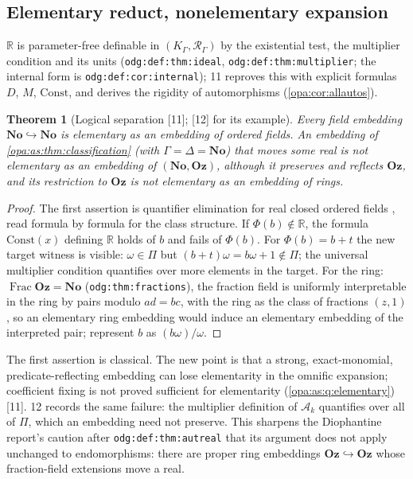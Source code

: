 \documentclass[11pt,oneside]{article}
\numberwithin{equation}{section}
\newtheorem{theorem}{Theorem}[section]
\theoremstyle{definition}
\theoremstyle{remark}
\newcommand{\No}{\mathbf{No}}
\newcommand{\Oz}{\mathbf{Oz}}
\newcommand{\R}{\mathbb R}
\newcommand{\Ak}{\mathcal A_k}
\newcommand{\Frac}{\operatorname{Frac}}
\newcommand{\src}[1]{\textup{\textsf{\small[#1]}}}
\newcommand{\lbl}[1]{\nolinkurl{#1}}
\begin{document}
\subsection{Elementary reduct, nonelementary expansion}

$\R$ is parameter-free definable in $(K_\Gamma,\mathcal R_\Gamma)$ by the existential test, the multiplier
condition and its units (\lbl{odg:def:thm:ideal}, \lbl{odg:def:thm:multiplier}; the internal form is
\lbl{odg:def:cor:internal}); 11 reproves this with explicit formulas $D$, $M$, $\mathrm{Const}$, and derives
the rigidity of automorphisms (\cref{opa:cor:allautos}).

\begin{theorem}[Logical separation \src{11}; \src{12} for its example]\label{opa:as:thm:elementary}
Every field embedding $\No\hookrightarrow\No$ is elementary as an embedding of ordered fields. An embedding
of \cref{opa:as:thm:classification} (with $\Gamma=\Delta=\No$) that moves some real is not elementary as an
embedding of $(\No,\Oz)$, although it preserves and reflects $\Oz$, and its restriction to $\Oz$ is not
elementary as an embedding of rings.
\end{theorem}
\begin{proof}
The first assertion is quantifier elimination for real closed ordered fields \cite{Marker}, read formula by
formula for the class structure. If $\Phi(b)\notin\R$, the formula $\mathrm{Const}(x)$ defining $\R$ holds of
$b$ and fails of $\Phi(b)$. For $\Phi(b)=b+t$ the new target witness is visible: $\omega\in\Pi$ but
$(b+t)\omega=b\omega+1\notin\Pi$; the universal multiplier condition quantifies over more elements in the
target. For the ring: $\Frac\Oz=\No$ (\lbl{odg:thm:fractions}), the fraction field is uniformly interpretable
in the ring by pairs modulo $ad=bc$, with the ring as the class of fractions $(z,1)$, so an elementary ring
embedding would induce an elementary embedding of the interpreted pair; represent $b$ as $(b\omega)/\omega$.
\end{proof}

The first assertion is classical. The new point is that a strong, exact-monomial, predicate-reflecting
embedding can lose elementarity in the omnific expansion; coefficient fixing is not proved sufficient for
elementarity (\cref{opa:as:q:elementary}) \src{11}. 12 records the same failure: the multiplier definition of
$\Ak$ quantifies over all of $\Pi$, which an embedding need not preserve. This sharpens the Diophantine
report's caution after \lbl{odg:def:thm:autreal} that its argument does not apply unchanged to endomorphisms:
there are proper ring embeddings $\Oz\hookrightarrow\Oz$ whose fraction-field extensions move a real.
\end{document}
